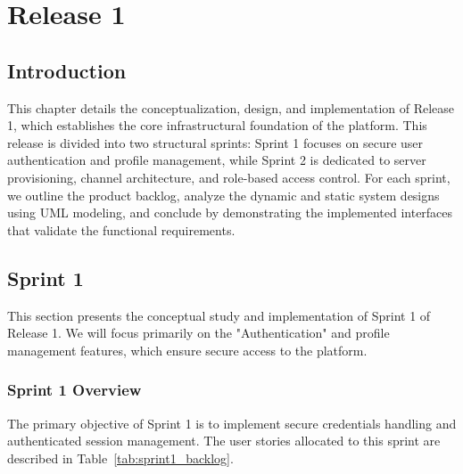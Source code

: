 
\chapter{Release 1}
\label{ch:chapter3}

\section{Introduction}
This chapter details the conceptualization, design, and implementation of Release 1, which establishes the core infrastructural foundation of the platform. This release is divided into two structural sprints: Sprint 1 focuses on secure user authentication and profile management, while Sprint 2 is dedicated to server provisioning, channel architecture, and role-based access control. For each sprint, we outline the product backlog, analyze the dynamic and static system designs using UML modeling, and conclude by demonstrating the implemented interfaces that validate the functional requirements.

\section{Sprint 1}
This section presents the conceptual study and implementation of Sprint 1 of Release 1. We will focus primarily on the "Authentication" and profile management features, which ensure secure access to the platform.

\subsection{Sprint 1 Overview}
The primary objective of Sprint 1 is to implement secure credentials handling and authenticated session management. The user stories allocated to this sprint are described in Table~\ref{tab:sprint1_backlog}.

